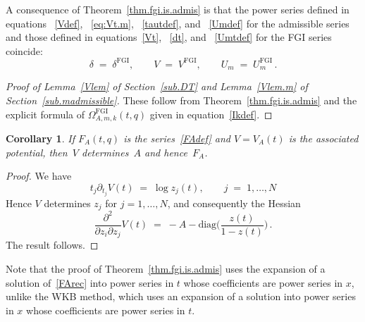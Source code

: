 \documentclass[12pt,reqno]{amsart}
\newtheorem{corollary}[proposition]{Corollary}
\theoremstyle{definition}
\def\pt{\partial}
\def\be{\begin{equation}}
\def\ee{\end{equation}}
\def\={\;=\;}
\def\FGI{\mathrm{FGI}}
\def\CS{\Omega^{\FGI}}
\begin{document}
A consequence of Theorem~\ref{thm.fgi.is.admis} is that the power series defined
in equations ~\eqref{Vdef}, ~\eqref{eq:Vt.m}, ~\eqref{tautdef}, and ~\eqref{Umdef}
for the admissible series and those defined in equations~\eqref{Vt}, ~\eqref{dt},
and ~\eqref{Umtdef} for the FGI series coincide:
\be
\label{eq.equal}
\delta \= \delta^\FGI, \qquad V \= V^\FGI, \qquad U_m \= U_m^\FGI \,.
\ee

\begin{proof}[Proof of Lemma~\ref{Vlem} of Section~\ref{sub.DT} and
  Lemma~\ref{Vlem.m} of Section~\ref{sub.madmissible}]
These follow from Theorem~\ref{thm.fgi.is.admis} and the explicit formula
of $\CS_{A,m,k}(t,q)$ given in equation~\eqref{Ikdef}.
\end{proof}

\begin{corollary}
\label{lem.V2F}
If $F_A(t,q)$ is the series~\eqref{FAdef} and $V=V_A(t)$ is the associated potential,
then~$V$ determines~$A$ and hence~$F_A$. 
\end{corollary}

\begin{proof}
We have
\be
\label{eq.V2F}
t_j \pt_{t_j} V(t) \= \log z_j(t), \qquad j\=1,\dots,N
\ee
Hence $V$ determines $z_j$ for $j=1,\dots,N$, and consequently the Hessian
\be
\label{Vhes}
\frac{\partial^2}{\partial z_i \partial z_j} V(t) \=
-A-\mathrm{diag}\Big(\frac{z(t)}{1-z(t)}\Big) \,.
\ee
The result follows.
\end{proof}

Note that the proof of Theorem~\ref{thm.fgi.is.admis} uses the expansion of a solution
of~\eqref{FArec} into power series in $t$ whose coefficients are power series in $x$,
unlike the WKB method, which uses an expansion of a solution into power series in
$x$ whose coefficients are power series in $t$.


\end{document}
